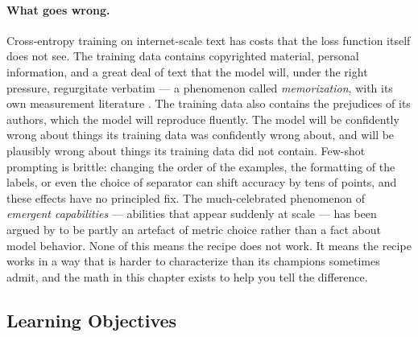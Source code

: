 \paragraph{What goes wrong.}
Cross-entropy training on internet-scale text has costs that the
loss function itself does not see. The training data contains
copyrighted material, personal information, and a great deal of
text that the model will, under the right pressure, regurgitate
verbatim --- a phenomenon called \emph{memorization}, with its
own measurement literature \citep{carlini2021extracting,
carlini2023quantifying}. The training data also contains the
prejudices of its authors, which the model will reproduce
fluently. The model will be confidently wrong about things its
training data was confidently wrong about, and will be plausibly
wrong about things its training data did not contain. Few-shot
prompting is brittle: changing the order of the examples, the
formatting of the labels, or even the choice of separator can shift
accuracy by tens of points, and these effects have no principled
fix. The much-celebrated phenomenon of \emph{emergent capabilities}
--- abilities that appear suddenly at scale --- has been argued by
\citet{schaeffer2023mirage} to be partly an artefact of metric
choice rather than a fact about model behavior. None of this means
the recipe does not work. It means the recipe works in a way that
is harder to characterize than its champions sometimes admit, and
the math in this chapter exists to help you tell the difference.

\subsection{Learning Objectives}

